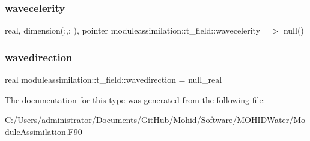 \subsubsection{\texorpdfstring{wavecelerity}{wavecelerity}}
{\footnotesize\ttfamily real, dimension(\+:,\+:  ), pointer moduleassimilation\+::t\+\_\+field\+::wavecelerity =$>$ null()\hspace{0.3cm}{\ttfamily [private]}}

\mbox{\label{structmoduleassimilation_1_1t__field_a56dcb0783c6171a42563233c21949890}} 
\subsubsection{\texorpdfstring{wavedirection}{wavedirection}}
{\footnotesize\ttfamily real moduleassimilation\+::t\+\_\+field\+::wavedirection = null\+\_\+real\hspace{0.3cm}{\ttfamily [private]}}



The documentation for this type was generated from the following file\+:\begin{DoxyCompactItemize}
\item 
C\+:/\+Users/administrator/\+Documents/\+Git\+Hub/\+Mohid/\+Software/\+M\+O\+H\+I\+D\+Water/\mbox{\hyperlink{_module_assimilation_8_f90}{Module\+Assimilation.\+F90}}\end{DoxyCompactItemize}
